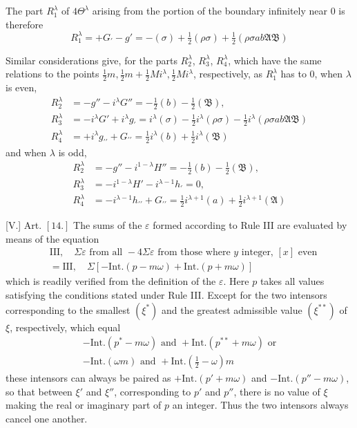 The part $R_1^\lambda$ of $4\Theta^\lambda$ arising from the portion of the boundary infinitely near $0$ is therefore
\[
R_1^\lambda=+G_{\prime}-g'=-(\sigma)+\tfrac12(\rho\sigma)+\tfrac12(\rho\sigma ab\mathfrak A\mathfrak B)
\]

Similar considerations give, for the parts $R_2^\lambda$, $R_3^\lambda$, $R_4^\lambda$, which have the same relations to the points $\tfrac12m,\tfrac12m+\tfrac12Mi^\lambda,\tfrac12Mi^\lambda$, respectively, as $R_1^\lambda$ has to $0$, when $\lambda$ is even,
\[
\begin{aligned}
R_2^\lambda&=-g''-i^\lambda G''=-\tfrac12(b)-\tfrac12(\mathfrak B),\\
R_3^\lambda&=-i^\lambda G'+i^\lambda g_{\prime}=i^\lambda(\sigma)-\tfrac12i^\lambda(\rho\sigma)-\tfrac12i^\lambda(\rho\sigma ab\mathfrak A\mathfrak B)\\
R_4^\lambda&=+i^\lambda g_{\prime\prime}+G_{\prime\prime}=\tfrac12i^\lambda(b)+\tfrac12i^\lambda(\mathfrak B)
\end{aligned}
\]
and when $\lambda$ is odd,
\[
\begin{aligned}
R_2^\lambda&=-g''-i^{1-\lambda}H''=-\tfrac12(b)-\tfrac12(\mathfrak B),\\
R_3^\lambda&=-i^{1-\lambda}H'-i^{\lambda-1}h_{\prime}=0,\\
R_4^\lambda&=-i^{\lambda-1}h_{\prime\prime}+G_{\prime\prime}=\tfrac12i^{\lambda+1}(a)+\tfrac12i^{\lambda+1}(\mathfrak A)
\end{aligned}
\]

[V.] Art. $[14.]$ The sums of the $\varepsilon$ formed according to Rule III are evaluated by means of the equation
\[
\begin{aligned}
&\mathrm{III},\quad\Sigma\varepsilon\text{ from all }-4\Sigma\varepsilon\text{ from those where }y\text{ integer, }[x]\text{ even}\\
&=\mathrm{III},\quad\Sigma[-\mathrm{Int.}(p-m\omega)+\mathrm{Int.}(p+m\omega)]
\end{aligned}
\]
which is readily verified from the definition of the $\varepsilon$. Here $p$ takes all values satisfying the conditions stated under Rule III. Except for the two intensors corresponding to the smallest $(\xi^{*})$ and the greatest admissible value $(\xi^{**})$ of $\xi$, respectively, which equal
\[
\begin{gathered}
-\mathrm{Int.}(p^{*}-m\omega)\text{ and }+\mathrm{Int.}(p^{**}+m\omega)\text{ or}\\
-\mathrm{Int.}(\omega m)\text{ and }+\mathrm{Int.}(\tfrac12-\omega)m
\end{gathered}
\]
these intensors can always be paired as $+\mathrm{Int.}(p'+m\omega)$ and $-\mathrm{Int.}(p''-m\omega)$, so that between $\xi'$ and $\xi''$, corresponding to $p'$ and $p''$, there is no value of $\xi$ making the real or imaginary part of $p$ an integer. Thus the two intensors always cancel one another.

